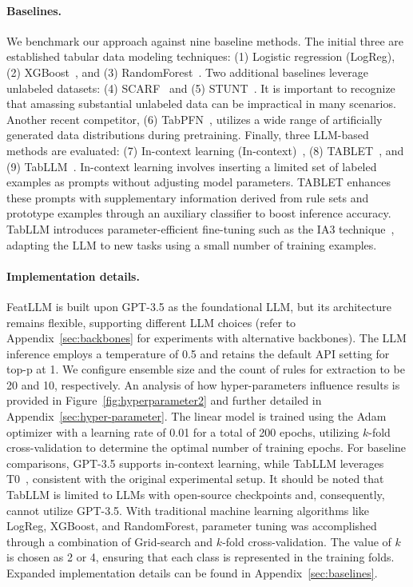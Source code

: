 \vspace*{-0.12in}
\paragraph{Baselines.}
We benchmark our approach against nine baseline methods. The initial three are established tabular data modeling techniques: (1) Logistic regression (LogReg), (2) XGBoost~\cite{chen2016xgboost}, and (3) RandomForest~\cite{ho1995random}. Two additional baselines leverage unlabeled datasets: (4) SCARF~\cite{bahri2022scarf} and (5) STUNT~\cite{nam2023stunt}. It is important to recognize that amassing substantial unlabeled data can be impractical in many scenarios. Another recent competitor, (6) TabPFN~\cite{hollmann2022tabpfn}, utilizes a wide range of artificially generated data distributions during pretraining. Finally, three LLM-based methods are evaluated: (7) In-context learning (In-context)~\cite{wei2022emergent}, (8) TABLET~\cite{slack2023tablet}, and (9) TabLLM~\cite{hegselmann2023tabllm}. In-context learning involves inserting a limited set of labeled examples as prompts without adjusting model parameters. TABLET enhances these prompts with supplementary information derived from rule sets and prototype examples through an auxiliary classifier to boost inference accuracy. TabLLM introduces parameter-efficient fine-tuning such as the IA3 technique~\cite{liu2022few}, adapting the LLM to new tasks using a small number of training examples.

\vspace*{-0.12in}
\paragraph{Implementation details.}
\textsf{FeatLLM} is built upon GPT-3.5 as the foundational LLM, but its architecture remains flexible, supporting different LLM choices (refer to Appendix~\ref{sec:backbones} for experiments with alternative backbones). The LLM inference employs a temperature of 0.5 and retains the default API setting for top-p at 1. We configure ensemble size and the count of rules for extraction to be 20 and 10, respectively. An analysis of how hyper-parameters influence results is provided in Figure~\ref{fig:hyperparameter2} and further detailed in Appendix~\ref{sec:hyper-parameter}.
The linear model is trained using the Adam optimizer with a learning rate of 0.01 for a total of 200 epochs, utilizing $k$-fold cross-validation to determine the optimal number of training epochs. For baseline comparisons, GPT-3.5 supports in-context learning, while TabLLM leverages T0~\cite{sanh2022multitask}, consistent with the original experimental setup. It should be noted that TabLLM is limited to LLMs with open-source checkpoints and, consequently, cannot utilize GPT-3.5. With traditional machine learning algorithms like LogReg, XGBoost, and RandomForest, parameter tuning was accomplished through a combination of Grid-search and $k$-fold cross-validation. The value of $k$ is chosen as 2 or 4, ensuring that each class is represented in the training folds. Expanded implementation details can be found in Appendix~\ref{sec:baselines}.

